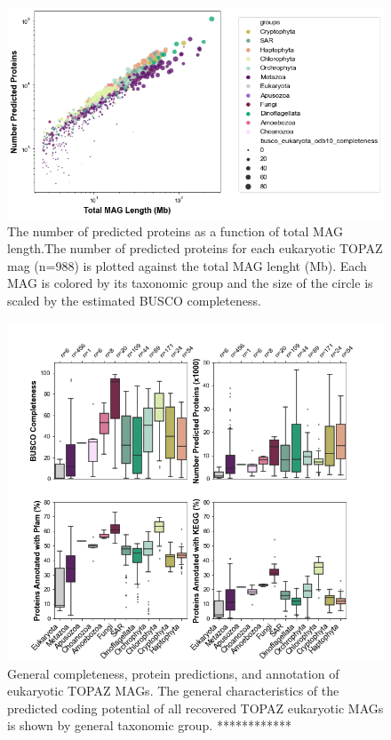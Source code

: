 \documentclass[12pt]{article}
\numberwithin{equation}{section}
\begin{document}
\begin{figure}
    \centering
    \includegraphics[width=0.95\columnwidth]{si-figures/ALL_MAGS_Num-Prot-Leng.png}
    \caption{The number of predicted proteins as a function of total MAG length.The number of predicted proteins for each eukaryotic TOPAZ mag (n=988) is plotted against the total MAG lenght (Mb). Each MAG is colored by its taxonomic group and the size of the circle is scaled by the estimated BUSCO completeness.}
    \label{fig:all-prot-len}
\end{figure}

\begin{landscape}
\begin{figure}
    \centering
    \includegraphics[width=0.8\columnwidth]{si-figures/ALL_MAG_protein_bar_plots.png}
    \caption{General completeness, protein predictions, and annotation of eukaryotic TOPAZ MAGs. The general characteristics of the predicted coding potential of all recovered TOPAZ eukaryotic MAGs is shown by general taxonomic group. ************}
    \label{fig:all-prot-bar}
\end{figure}
\end{landscape}
\end{document}
